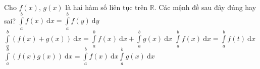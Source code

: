 \begin{ex}%
Cho $f(x)$, $g(x)$ là hai hàm số liên tục trên $\mathbb{R}$. Các mệnh đề sau đây đúng hay sai?
\choiceTF
{\True $\displaystyle\int\limits_a^bf(x)\mathrm{~d}x=\displaystyle\int\limits_a^bf(y)\mathrm{~d}y$}
{\True $\displaystyle\int\limits_a^b{\left(f(x)+g(x)\right)\mathrm{~d}x}=\displaystyle\int\limits_a^b{f(x)\mathrm{~d}x+\displaystyle\int\limits_a^b{g(x)\mathrm{~d}x}}$}
{$\displaystyle\int\limits_a^b{f(x)\mathrm{~d}x=\displaystyle\int\limits_a^b{f(t)\mathrm{~d}x}}$}
{$\displaystyle\int\limits_a^b{\left(f(x)g(x)\right)\mathrm{~d}x}=\displaystyle\int\limits_a^b{f(x)\mathrm{~d}x\displaystyle\int\limits_a^b{g(x)\mathrm{~d}x}}$}
\end{ex}

